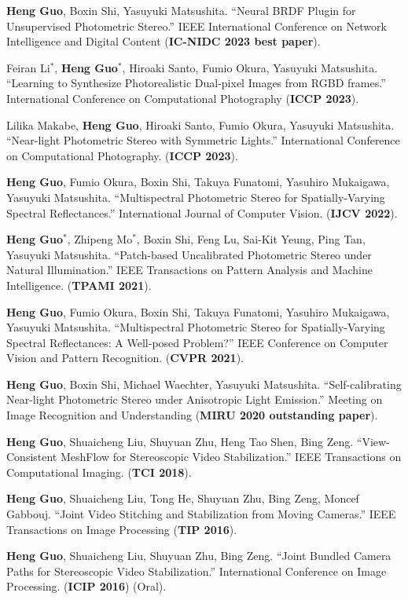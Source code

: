 \documentclass[UTF8]{ctexart}
\begin{document}
\begin{enumerate}[label={[\arabic*]}]
		\item \textbf{Heng Guo}, Boxin Shi, Yasuyuki Matsushita. ``Neural BRDF Plugin for Unsupervised Photometric Stereo.'' IEEE International Conference on Network Intelligence and Digital Content (\textbf{IC-NIDC 2023 best paper}).
		\item Feiran Li$^*$, \textbf{Heng Guo}$^*$, Hiroaki Santo, Fumio Okura, Yasuyuki Matsushita. ``Learning to Synthesize Photorealistic Dual-pixel Images from RGBD frames.'' International Conference on Computational Photography (\textbf{ICCP 2023}).
		\item Lilika Makabe, \textbf{Heng Guo}, Hiroaki Santo, Fumio Okura, Yasuyuki Matsushita. ``Near-light Photometric Stereo with Symmetric Lights.'' International Conference on Computational Photography. (\textbf{ICCP 2023}).
		\item \textbf{Heng Guo}, Fumio Okura, Boxin Shi, Takuya Funatomi, Yasuhiro Mukaigawa, Yasuyuki Matsushita. ``Multispectral Photometric Stereo for Spatially-Varying Spectral Reflectances.'' International Journal of Computer Vision. (\textbf{IJCV 2022}). 
		\item \textbf{Heng Guo$^*$}, Zhipeng Mo$^*$, Boxin Shi, Feng Lu, Sai-Kit Yeung, Ping Tan, Yasuyuki Matsushita. ``Patch-based Uncalibrated Photometric Stereo under Natural Illumination.'' 
		IEEE Transactions on Pattern Analysis and Machine Intelligence. (\textbf{TPAMI 2021}). 
		\item \textbf{Heng Guo}, Fumio Okura, Boxin Shi, Takuya Funatomi, Yasuhiro Mukaigawa, Yasuyuki Matsushita. ``Multispectral Photometric Stereo for Spatially-Varying Spectral Reflectances: A Well-posed Problem?'' IEEE Conference on Computer Vision and Pattern Recognition. (\textbf{CVPR 2021}). 
		\item \textbf{Heng Guo}, Boxin Shi, Michael Waechter, Yasuyuki Matsushita. ``Self-calibrating Near-light Photometric Stereo under Anisotropic Light Emission.'' Meeting on Image Recognition and Understanding (\textbf{MIRU 2020 outstanding paper}).  
		\item \textbf{Heng Guo}, Shuaicheng Liu, Shuyuan Zhu, Heng Tao Shen, Bing Zeng. ``View-Consistent MeshFlow for Stereoscopic Video Stabilization.'' IEEE Transactions on Computational Imaging. (\textbf{TCI 2018}).
		\item \textbf{Heng Guo}, Shuaicheng Liu, Tong He, Shuyuan Zhu, Bing Zeng, Moncef Gabbouj. ``Joint Video Stitching and Stabilization from Moving Cameras.'' IEEE Transactions on Image Processing (\textbf{TIP 2016}).
		\item \textbf{Heng Guo}, Shuaicheng Liu, Shuyuan Zhu, Bing Zeng. ``Joint Bundled Camera Paths for Stereoscopic Video Stabilization.'' International Conference on Image Processing. (\textbf{ICIP 2016}) (Oral).

	\end{enumerate}
	
\end{document}
